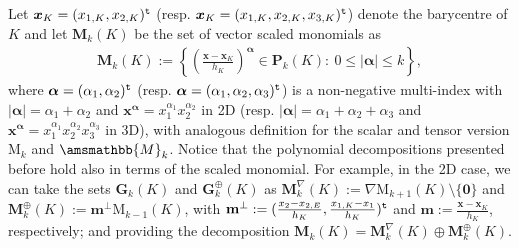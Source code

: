 \documentclass[fleqn,a4paper]{cas-sc}
\newcommand{\bx}{\boldsymbol{x}}
\newcommand{\bm}{\mathbf{m}}
\newcommand{\0}{\boldsymbol{0}}
\newcommand\bP{\mathbf{P}}
\newcommand\bG{\mathbf{G}}
\newcommand\bM{\mathbf{M}}
\newcommand\rM{\mathrm{M}}
\newcommand\bbM{\amsmathbb{M}}
\numberwithin{equation}{section}
\numberwithin{figure}{section}
\begin{document}
Let $\bx_K = (x_{1,K},x_{2,K})^{\tt t}$ (resp. $\bx_K = (x_{1,K},x_{2,K},x_{3,K})^{\tt t}$) denote the barycentre of $K$ and let $\bM_k(K)$ be the set of vector scaled monomials as
\begin{align*}
    \bM_k(K):=\left\{ \left( \frac{\bx-\bx_K}{h_K} \right)^{\boldsymbol{\alpha}}\in \bP_k(K):\ 0\leq |\boldsymbol{\alpha}|\leq k \right\},
\end{align*}
where $\boldsymbol{\alpha}=(\alpha_1,\alpha_2)^{\tt t}$ (resp. $\boldsymbol{\alpha}=(\alpha_1,\alpha_2,\alpha_3)^{\tt t}$) is a non-negative multi-index with $|\boldsymbol{\alpha}|=\alpha_1+\alpha_2$ and $\bx^{\boldsymbol{\alpha}}=x_1^{\alpha_1}x_2^{\alpha_2}$ in 2D (resp. $|\boldsymbol{\alpha}|=\alpha_1+\alpha_2+\alpha_3$ and $\bx^{\boldsymbol{\alpha}}=x_1^{\alpha_1}x_2^{\alpha_2}x_3^{\alpha_3}$ in 3D), with analogous definition for the scalar and tensor version $\rM_k$ and $\bbM_k$. Notice that the polynomial decompositions presented before hold also in terms of the scaled monomial. For example, in the 2D case, we can take the sets $\bG_{k}(K)$ and $\bG_{k}^\oplus(K)$ as $\bM_{k}^{\nabla}(K):=\nabla\rM_{k+1}(K)\setminus\{\mathbf{0}\}$ and $\bM_{k}^{\oplus}(K):=\bm^\perp \rM_{k-1}(K)$, with $\bm^\perp := (\frac{x_2-x_{2,E}}{h_K},\frac{x_{1,K}-x_1}{h_K})^{\tt t}$ and $\bm :=  \frac{\bx-\bx_K}{h_K}$, respectively; and providing the decomposition $\bM_{k}(K)=\bM_{k}^{\nabla}(K)\oplus \bM_{k}^{\oplus}(K)$.
\end{document}
